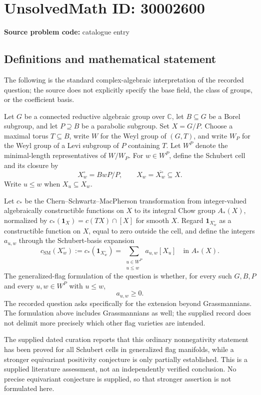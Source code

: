 \documentclass[11pt]{article}
\newcommand{\C}{\mathbb{C}}
\begin{document}
\section*{UnsolvedMath ID: 30002600}
\textbf{Source problem code:} catalogue entry
\subsection{Definitions and mathematical statement}
The following is the standard complex-algebraic interpretation of the recorded question; the source does not explicitly specify the base field, the class of groups, or the coefficient basis.

Let \(G\) be a connected reductive algebraic group over \(\C\), let \(B\subseteq G\) be a Borel subgroup, and let \(P\supseteq B\) be a parabolic subgroup. Set \(X=G/P\). Choose a maximal torus \(T\subseteq B\), write \(W\) for the Weyl group of \((G,T)\), and write \(W_P\) for the Weyl group of a Levi subgroup of \(P\) containing \(T\). Let \(W^P\) denote the minimal-length representatives of \(W/W_P\). For \(w\in W^P\), define the Schubert cell and its closure by
\[
X_w^{\circ}=BwP/P,\qquad X_w=\overline{X_w^{\circ}}\subseteq X.
\]
Write \(u\leq w\) when \(X_u\subseteq X_w\).

Let \(c_*\) be the Chern--Schwartz--MacPherson transformation from integer-valued algebraically constructible functions on \(X\) to its integral Chow group \(A_*(X)\), normalized by \(c_*(\mathbf{1}_X)=c(TX)\cap[X]\) for smooth \(X\). Regard \(\mathbf{1}_{X_w^{\circ}}\) as a constructible function on \(X\), equal to zero outside the cell, and define the integers \(a_{u,w}\) through the Schubert-basis expansion
\[
c_{\mathrm{SM}}(X_w^{\circ}):=c_*(\mathbf{1}_{X_w^{\circ}})
=\sum_{\substack{u\in W^P\\u\leq w}}a_{u,w}[X_u]
\quad\text{in }A_*(X).
\]
The generalized-flag formulation of the question is whether, for every such \(G,B,P\) and every \(u,w\in W^P\) with \(u\leq w\),
\[
a_{u,w}\geq 0.
\]
The recorded question asks specifically for the extension beyond Grassmannians. The formulation above includes Grassmannians as well; the supplied record does not delimit more precisely which other flag varieties are intended.

The supplied dated curation reports that this ordinary nonnegativity statement has been proved for all Schubert cells in generalized flag manifolds, while a stronger equivariant positivity conjecture is only partially established. This is a supplied literature assessment, not an independently verified conclusion. No precise equivariant conjecture is supplied, so that stronger assertion is not formulated here.
\end{document}
